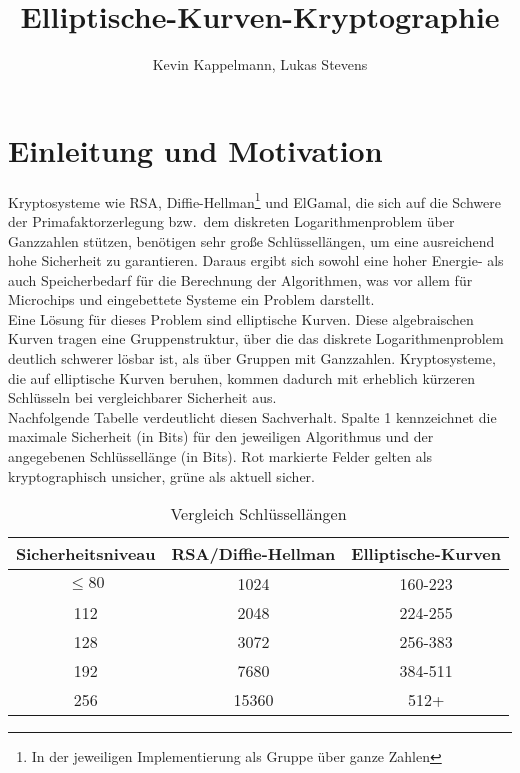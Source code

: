 \documentclass[hidelinks]{article}
\title{Elliptische-Kurven-Kryptographie}
\author{Kevin Kappelmann, Lukas Stevens}
\theoremstyle{plain}
\theoremstyle{definition}
\theoremstyle{rem}
\begin{document}
\maketitle
\vspace{6em}
\newpage
\tableofcontents %
\listoffigures %
\listoftables %
\newpage


\begin{sloppypar}

\section{Einleitung und Motivation}
Kryptosysteme wie RSA, Diffie-Hellman\footnote{In der jeweiligen Implementierung als Gruppe über ganze Zahlen} und ElGamal\footnotemark[\value{footnote}], die sich auf die Schwere der Primafaktorzerlegung bzw.\ dem diskreten Logarithmenproblem über Ganzzahlen stützen, benötigen sehr große Schlüssellängen, um eine ausreichend hohe Sicherheit zu garantieren. 
Daraus ergibt sich sowohl eine hoher Energie- als auch Speicherbedarf für die Berechnung der Algorithmen, was vor allem für Microchips und eingebettete Systeme ein Problem darstellt.\\
Eine Lösung für dieses Problem sind elliptische Kurven. Diese algebraischen Kurven tragen eine Gruppenstruktur, über die das diskrete Logarithmenproblem deutlich schwerer lösbar ist, als über Gruppen mit Ganzzahlen.
Kryptosysteme, die auf elliptische Kurven beruhen, kommen dadurch mit erheblich kürzeren Schlüsseln bei vergleichbarer Sicherheit aus.\cite[Seite~53]{nist}\\
Nachfolgende Tabelle verdeutlicht diesen Sachverhalt. Spalte 1 kennzeichnet die maximale Sicherheit (in Bits) für den jeweiligen Algorithmus und der angegebenen Schlüssellänge (in Bits). Rot markierte Felder gelten als kryptographisch unsicher, grüne als aktuell sicher.
\begin{table}[h]
\centering
	\begin{tabular}{| c | c | c |}
	\hline
	\rowcolor{lightblue}
	Sicherheitsniveau & RSA/Diffie-Hellman\footnotemark[\value{footnote}] & Elliptische-Kurven\\ \hline
	\rowcolor{lightred}
	$\le80$ 	& 1024 & 160-223 \\ \hline
	\rowcolor{lightgreen}
	112 	& 2048 & 224-255 \\ \hline
	\rowcolor{lightgreen}
	128 	& 3072 & 256-383 \\ \hline
	\rowcolor{lightgreen}
	192 	& 7680 & 384-511 \\ \hline
	\rowcolor{lightgreen}
	256 	& 15360 & 512+ \\ \hline
	\end{tabular}
\caption{Vergleich Schlüssellängen}
\end{table}


\end{sloppypar}
\end{document}
